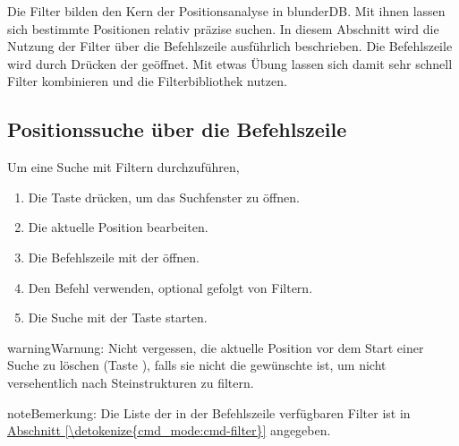 \documentclass[letterpaper,10pt,german]{sphinxmanual}
\begin{document}
\sphinxAtStartPar
Die Filter bilden den Kern der Positionsanalyse in blunderDB. Mit ihnen lassen sich bestimmte Positionen relativ präzise suchen. In diesem Abschnitt wird die Nutzung der Filter über die Befehlszeile ausführlich beschrieben. Die Befehlszeile wird durch Drücken der  geöffnet. Mit etwas Übung lassen sich damit sehr schnell Filter kombinieren und die Filterbibliothek nutzen.


\subsection{Positionssuche über die Befehlszeile}
\label{\detokenize{annexe_filtres:recherche-de-positions-en-ligne-de-commande}}
\sphinxAtStartPar
Um eine Suche mit Filtern durchzuführen,
\begin{enumerate}
%
\item {} 
\sphinxAtStartPar
Die Taste  drücken, um das Suchfenster zu öffnen.

\item {} 
\sphinxAtStartPar
Die aktuelle Position bearbeiten.

\item {} 
\sphinxAtStartPar
Die Befehlszeile mit der  öffnen.

\item {} 
\sphinxAtStartPar
Den Befehl  verwenden, optional gefolgt von Filtern.

\item {} 
\sphinxAtStartPar
Die Suche mit der \sphinxhyphen{}Taste starten.

\end{enumerate}

\begin{sphinxadmonition}{warning}{Warnung:}
\sphinxAtStartPar
Nicht vergessen, die aktuelle Position vor dem Start einer Suche zu löschen (Taste ), falls sie nicht die gewünschte ist, um nicht versehentlich nach Steinstrukturen zu filtern.
\end{sphinxadmonition}

\begin{sphinxadmonition}{note}{Bemerkung:}
\sphinxAtStartPar
Die Liste der in der Befehlszeile verfügbaren Filter ist in \hyperref[\detokenize{cmd_mode:cmd-filter}]{Abschnitt \ref{\detokenize{cmd_mode:cmd-filter}}} angegeben.
\end{sphinxadmonition}
\end{document}
